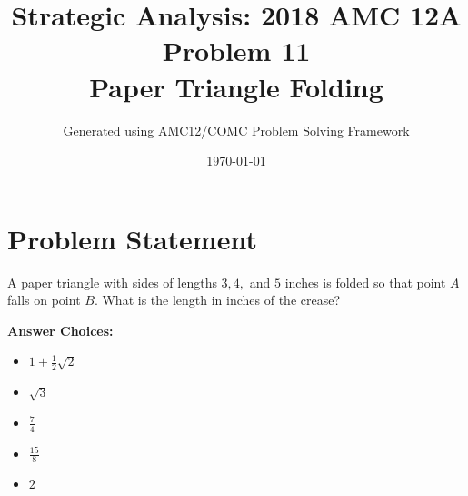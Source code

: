 \documentclass[12pt]{article}
\title{\textbf{Strategic Analysis: 2018 AMC 12A Problem 11\\Paper Triangle Folding}}
\author{Generated using AMC12/COMC Problem Solving Framework}
\date{\today}
\begin{document}
\maketitle

\section*{Problem Statement}

A paper triangle with sides of lengths $3, 4,$ and $5$ inches is folded so that point $A$ falls on point $B$. What is the length in inches of the crease?

\textbf{Answer Choices:}
\begin{itemize}
    \item[(A)] $1+\frac{1}{2}\sqrt{2}$
    \item[(B)] $\sqrt{3}$
    \item[(C)] $\frac{7}{4}$
    \item[(D)] $\frac{15}{8}$
    \item[(E)] $2$
\end{itemize}
\end{document}

